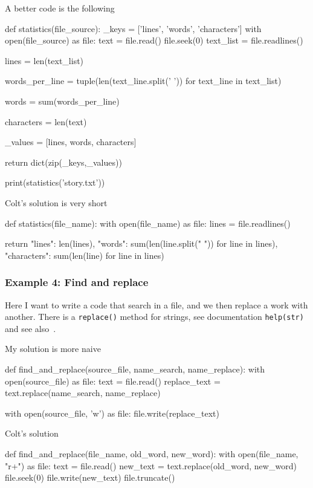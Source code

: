 A better code is the following 
\begin{listing}{1}
def statistics(file_source):
    _keys = ['lines', 'words', 'characters']
    with open(file_source) as file:
        text = file.read()
        file.seek(0)
        text_list = file.readlines()

        lines = len(text_list)

        words_per_line = tuple(len(text_line.split(' ')) for text_line in text_list)

        words = sum(words_per_line)

        characters = len(text) 

        _values = [lines, words, characters]

    return dict(zip(_keys,_values))

print(statistics('story.txt'))    
\end{listing}

Colt's solution is very short
\begin{listing}{1}
def statistics(file_name):
    with open(file_name) as file:
        lines = file.readlines()
 
    return { "lines": len(lines),
             "words": sum(len(line.split(" ")) for line in lines),
             "characters": sum(len(line) for line in lines) }    
\end{listing}


\subsubsection{Example 4: Find and replace}

Here I want to write a code that search in a file, and we then replace a work with another. There is a \verb|replace()| method for strings, see documentation \verb|help(str)| and see also~\cite{strings:replace}. 

My solution is more naive
\begin{listing}{1}
def find_and_replace(source_file, name_search, name_replace):
    with open(source_file) as file:
        text = file.read()
        replace_text = text.replace(name_search, name_replace)

    with open(source_file, 'w') as file:        
        file.write(replace_text)    
\end{listing}

Colt's solution 
\begin{listing}{1}
def find_and_replace(file_name, old_word, new_word):
    with open(file_name, "r+") as file:
        text = file.read()
        new_text = text.replace(old_word, new_word)
        file.seek(0)
        file.write(new_text)
        file.truncate()    
\end{listing}